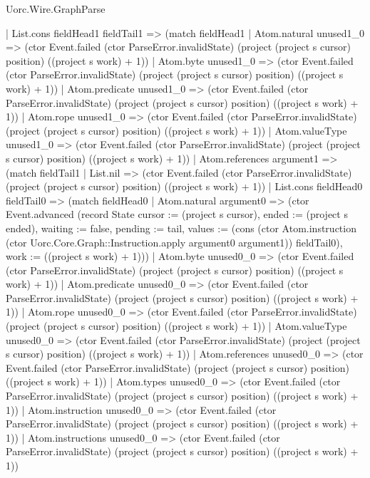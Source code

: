 \begin{lexlean}{Uorc.Wire.GraphParse}
\begin{semanticmodule}
{        | List.cons fieldHead1 fieldTail1 => (match fieldHead1
          | Atom.natural unused1_0 => (ctor Event.failed (ctor ParseError.invalidState) (project (project s cursor) position) ((project s work) + 1))
          | Atom.byte unused1_0 => (ctor Event.failed (ctor ParseError.invalidState) (project (project s cursor) position) ((project s work) + 1))
          | Atom.predicate unused1_0 => (ctor Event.failed (ctor ParseError.invalidState) (project (project s cursor) position) ((project s work) + 1))
          | Atom.rope unused1_0 => (ctor Event.failed (ctor ParseError.invalidState) (project (project s cursor) position) ((project s work) + 1))
          | Atom.valueType unused1_0 => (ctor Event.failed (ctor ParseError.invalidState) (project (project s cursor) position) ((project s work) + 1))
          | Atom.references argument1 => (match fieldTail1
            | List.nil => (ctor Event.failed (ctor ParseError.invalidState) (project (project s cursor) position) ((project s work) + 1))
            | List.cons fieldHead0 fieldTail0 => (match fieldHead0
              | Atom.natural argument0 => (ctor Event.advanced (record State {cursor := (project s cursor), ended := (project s ended), waiting := false, pending := tail, values := (cons (ctor Atom.instruction (ctor Uorc.Core.Graph::Instruction.apply argument0 argument1)) fieldTail0), work := ((project s work) + 1)}))
              | Atom.byte unused0_0 => (ctor Event.failed (ctor ParseError.invalidState) (project (project s cursor) position) ((project s work) + 1))
              | Atom.predicate unused0_0 => (ctor Event.failed (ctor ParseError.invalidState) (project (project s cursor) position) ((project s work) + 1))
              | Atom.rope unused0_0 => (ctor Event.failed (ctor ParseError.invalidState) (project (project s cursor) position) ((project s work) + 1))
              | Atom.valueType unused0_0 => (ctor Event.failed (ctor ParseError.invalidState) (project (project s cursor) position) ((project s work) + 1))
              | Atom.references unused0_0 => (ctor Event.failed (ctor ParseError.invalidState) (project (project s cursor) position) ((project s work) + 1))
              | Atom.types unused0_0 => (ctor Event.failed (ctor ParseError.invalidState) (project (project s cursor) position) ((project s work) + 1))
              | Atom.instruction unused0_0 => (ctor Event.failed (ctor ParseError.invalidState) (project (project s cursor) position) ((project s work) + 1))
              | Atom.instructions unused0_0 => (ctor Event.failed (ctor ParseError.invalidState) (project (project s cursor) position) ((project s work) + 1))
}
\end{semanticmodule}
\end{lexlean}
